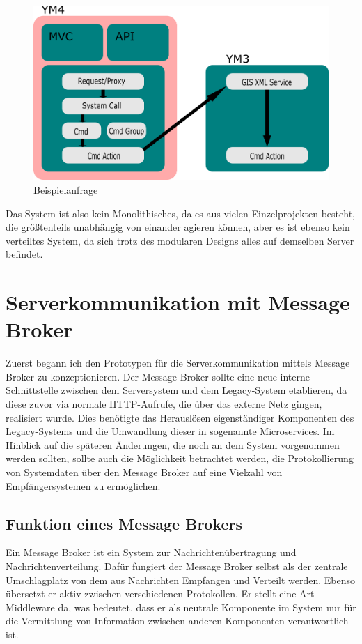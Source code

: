 \documentclass[12pt,a4paper]{scrartcl}
\begin{document}
\begin{figure}[h!]
	\centering
	\includegraphics[scale=2]{YmSysReq.png}
	\caption[Selbst erstellte Grafik]{Beispielanfrage}
\end{figure}

Das System ist also kein Monolithisches, da es aus vielen Einzelprojekten besteht, die größtenteils unabhängig von einander agieren können, aber es ist ebenso kein verteiltes System, da sich trotz des modularen Designs alles auf demselben Server befindet.

\section{Serverkommunikation mit Message Broker} \label{rabbit}
Zuerst begann ich den Prototypen für die Serverkommunikation mittels Message Broker zu konzeptionieren. Der Message Broker sollte eine neue interne Schnittstelle zwischen dem Serversystem und dem Legacy-System etablieren, da diese zuvor via normale HTTP-Aufrufe, die über das externe Netz gingen, realisiert wurde. Dies benötigte das Herauslösen eigenständiger Komponenten des Legacy-Systems und die Umwandlung dieser in sogenannte Microservices. Im Hinblick auf die späteren Änderungen, die noch an dem System vorgenommen werden sollten, sollte auch die Möglichkeit betrachtet werden, die Protokollierung von Systemdaten über den Message Broker auf eine Vielzahl von Empfängersystemen zu ermöglichen. 

\subsection{Funktion eines Message Brokers}
Ein Message Broker ist ein System zur Nachrichtenübertragung und Nachrichtenverteilung. Dafür fungiert der Message Broker selbst als der zentrale Umschlagplatz von dem aus Nachrichten Empfangen und Verteilt werden. Ebenso übersetzt er aktiv zwischen verschiedenen Protokollen\cite{mesBro}. Er stellt eine Art Middleware da, was bedeutet, dass er als neutrale Komponente im System nur für die Vermittlung von Information zwischen anderen Komponenten verantwortlich ist.
\end{document}
